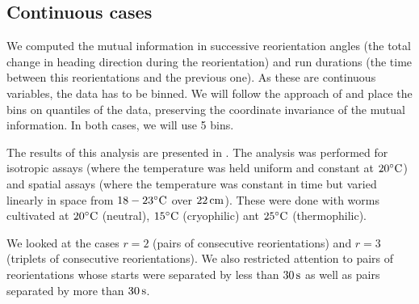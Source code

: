 \documentclass[12pt]{article}
\begin{document}
\subsection{Continuous cases}\label{sec:ctsresults}

We computed the mutual information in successive reorientation angles (the total change in heading direction during the reorientation)  and run durations (the time between this reorientations and the previous one). As these are continuous variables, the data has to be binned. We will follow the approach of \cite{Slonim:2005} and place the bins on quantiles of the data, preserving the coordinate invariance of the mutual information. In both cases, we will use 5 bins.


The results of this analysis are presented in . The analysis was performed for isotropic assays (where the temperature was held uniform and constant at $20^\circ\mathrm{C}$) and spatial assays (where the temperature was constant in time but varied linearly in space from $18-23^\circ\mathrm{C}$ over $22\,\mathrm{cm}$). These were done with worms cultivated at $20^\circ\mathrm{C}$ (neutral), $15^\circ\mathrm{C}$ (cryophilic) ant $25^\circ\mathrm{C}$ (thermophilic).

We looked at the cases $r=2$ (pairs of consecutive reorientations) and $r=3$ (triplets of consecutive reorientations). We also restricted attention to pairs of reorientations whose starts were separated by less than $30\,\mathrm{s}$ as well as pairs separated by more than $30\,\mathrm{s}$.

\end{document}
